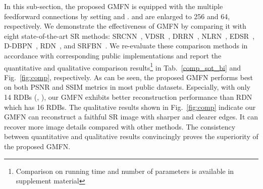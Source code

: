 \documentclass{bmvc2k}
\begin{document}
	In this sub-section, the proposed GMFN is equipped with the multiple feedforward connections by setting  and .  and  are enlarged to 256 and 64, respectively. We demonstrate the effectiveness of GMFN by comparing it with eight state-of-the-art SR methods: SRCNN~\cite{dong2014learning}, VDSR~\cite{kim2016accurate}, DRRN~\cite{tai2017image}, NLRN~\cite{nlrn2018}, EDSR~\cite{lim2017enhanced}, D-DBPN~\cite{haris2018deep}, RDN~\cite{zhang2018residual}, and SRFBN~\cite{li2019srfbn}. We re-evaluate these comparison methods in accordance with corresponding public implementations and report the quantitative and qualitative comparison results\footnote{Comparison on running time and number of parameters is available in supplement material} in Tab.~\ref{comp_sot_bi} and Fig.~\ref{fig:comp}, respectively. As can be seen, the proposed GMFN performs best on both PSNR and SSIM metrics in most public datasets. Especially, with only 14 RDBs (, ), our GMFN exhibits better reconstruction performance than RDN which has 16 RDBs. The qualitative results shown in Fig.~\ref{fig:comp} indicate our GMFN can reconstruct a faithful SR image with sharper and clearer edges. It can recover more image details compared with other methods. The consistency between quantitative and qualitative results convincingly proves the superiority of the proposed GMFN. 
\end{document}
